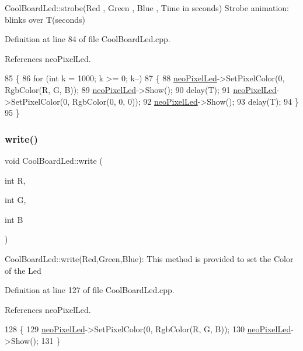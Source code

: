 Cool\+Board\+Led\+::strobe(\+Red , Green , Blue , Time in seconds) Strobe animation\+: blinks over T(seconds) 

Definition at line 84 of file Cool\+Board\+Led.\+cpp.



References neo\+Pixel\+Led.


\begin{DoxyCode}
85 \{
86     \textcolor{keywordflow}{for} (\textcolor{keywordtype}{int} k = 1000; k >= 0; k--) 
87     \{
88         \hyperlink{classCoolBoardLed_ac2c13fa462a010cd9242bf297c013923}{neoPixelLed}->SetPixelColor(0, RgbColor(R, G, B));
89         \hyperlink{classCoolBoardLed_ac2c13fa462a010cd9242bf297c013923}{neoPixelLed}->Show();
90         delay(T);
91         \hyperlink{classCoolBoardLed_ac2c13fa462a010cd9242bf297c013923}{neoPixelLed}->SetPixelColor(0, RgbColor(0, 0, 0));
92         \hyperlink{classCoolBoardLed_ac2c13fa462a010cd9242bf297c013923}{neoPixelLed}->Show();
93         delay(T);
94     \}
95 \}
\end{DoxyCode}
\mbox{\label{classCoolBoardLed_a30fadd4cbec17ceea428bf7a32207e87}} 
\subsubsection{\texorpdfstring{write()}{write()}}
{\footnotesize\ttfamily void Cool\+Board\+Led\+::write (\begin{DoxyParamCaption}\item[{int}]{R,  }\item[{int}]{G,  }\item[{int}]{B }\end{DoxyParamCaption})}

Cool\+Board\+Led\+::write(\+Red,\+Green,\+Blue)\+: This method is provided to set the Color of the Led 

Definition at line 127 of file Cool\+Board\+Led.\+cpp.



References neo\+Pixel\+Led.


\begin{DoxyCode}
128 \{
129     \hyperlink{classCoolBoardLed_ac2c13fa462a010cd9242bf297c013923}{neoPixelLed}->SetPixelColor(0, RgbColor(R, G, B));
130     \hyperlink{classCoolBoardLed_ac2c13fa462a010cd9242bf297c013923}{neoPixelLed}->Show();
131 \}
\end{DoxyCode}


